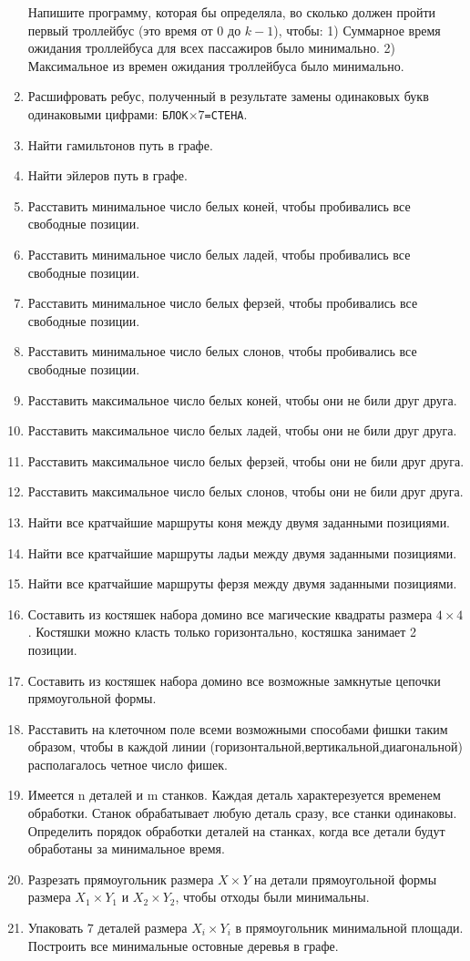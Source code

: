 \documentclass[12pt, openany, oneside]{book} %
\begin{document}
\begin{enumerate}
Напишите программу, которая бы определяла, во сколько должен пройти
первый троллейбус (это время от $0$ до $k-1$), чтобы:
1) Суммарное время ожидания троллейбуса для всех пассажиров было минимально.
2) Максимальное из времен ожидания троллейбуса было минимально.
\item Расшифровать ребус, полученный в результате замены одинаковых букв
одинаковыми цифрами: \texttt{БЛОК$\times 7$=СТЕНА}.
\item Найти гамильтонов путь в графе.
\item Найти эйлеров путь в графе.
\item Расставить минимальное число белых коней, чтобы пробивались все свободные позиции.
\item Расставить минимальное число белых ладей, чтобы пробивались все свободные позиции.
\item Расставить минимальное число белых ферзей, чтобы пробивались все свободные позиции.
\item Расставить минимальное число белых слонов, чтобы пробивались все свободные позиции.
\item Расставить максимальное число белых коней, чтобы они не били друг друга.
\item Расставить максимальное число белых ладей, чтобы они не били друг друга.
\item Расставить максимальное число белых ферзей, чтобы они не били друг друга.
\item Расставить максимальное число белых слонов, чтобы они не били друг друга.
\item Найти все кратчайшие маршруты коня между двумя заданными позициями.
\item Найти все кратчайшие маршруты ладьи между двумя заданными позициями.
\item Найти все кратчайшие маршруты ферзя между двумя заданными позициями.
\item Составить из костяшек набора домино все магические квадраты размера $4\times 4$. Костяшки можно класть только горизонтально, костяшка занимает 2 позиции.
\item Составить из костяшек набора домино все возможные замкнутые цепочки прямоугольной формы.
\item Расставить на клеточном поле всеми возможными способами фишки таким образом, чтобы в каждой линии (горизонтальной,вертикальной,диагональной) располагалось четное число фишек.
\item Имеется n деталей и m станков. Каждая деталь характерезуется временем обработки. Станок обрабатывает любую деталь сразу, все станки одинаковы. Определить порядок обработки деталей на станках, когда все детали будут обработаны за минимальное время.
\item Разрезать прямоугольник размера $X\times Y$ на детали прямоугольной формы размера $X_1\times Y_1$ и $X_2 \times Y_2$, чтобы отходы были минимальны.
\item Упаковать $7$ деталей размера $X_i \times Y_i$ в прямоугольник минимальной площади.
Построить все минимальные остовные деревья в графе.
\end{enumerate}
\end{document}
